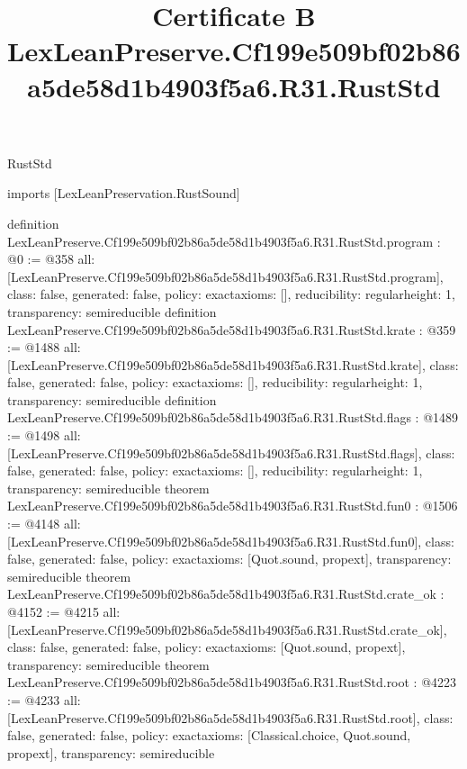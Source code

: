 \begin{lexlean}{RustStd}
\title{Certificate B LexLeanPreserve.Cf199e509bf02b86a5de58d1b4903f5a6.R31.RustStd}
\begin{coremodule}
imports [LexLeanPreservation.RustSound]

definition LexLeanPreserve.Cf199e509bf02b86a5de58d1b4903f5a6.R31.RustStd.program : @0 := @358 {
  all: [LexLeanPreserve.Cf199e509bf02b86a5de58d1b4903f5a6.R31.RustStd.program],
  class: false,
  generated: false,
  policy: exact{axioms: []},
  reducibility: regular{height: 1},
  transparency: semireducible
}
definition LexLeanPreserve.Cf199e509bf02b86a5de58d1b4903f5a6.R31.RustStd.krate : @359 := @1488 {
  all: [LexLeanPreserve.Cf199e509bf02b86a5de58d1b4903f5a6.R31.RustStd.krate],
  class: false,
  generated: false,
  policy: exact{axioms: []},
  reducibility: regular{height: 1},
  transparency: semireducible
}
definition LexLeanPreserve.Cf199e509bf02b86a5de58d1b4903f5a6.R31.RustStd.flags : @1489 := @1498 {
  all: [LexLeanPreserve.Cf199e509bf02b86a5de58d1b4903f5a6.R31.RustStd.flags],
  class: false,
  generated: false,
  policy: exact{axioms: []},
  reducibility: regular{height: 1},
  transparency: semireducible
}
theorem LexLeanPreserve.Cf199e509bf02b86a5de58d1b4903f5a6.R31.RustStd.fun0 : @1506 := @4148 {
  all: [LexLeanPreserve.Cf199e509bf02b86a5de58d1b4903f5a6.R31.RustStd.fun0],
  class: false,
  generated: false,
  policy: exact{axioms: [Quot.sound, propext]},
  transparency: semireducible
}
theorem LexLeanPreserve.Cf199e509bf02b86a5de58d1b4903f5a6.R31.RustStd.crate_ok : @4152 := @4215 {
  all: [LexLeanPreserve.Cf199e509bf02b86a5de58d1b4903f5a6.R31.RustStd.crate_ok],
  class: false,
  generated: false,
  policy: exact{axioms: [Quot.sound, propext]},
  transparency: semireducible
}
theorem LexLeanPreserve.Cf199e509bf02b86a5de58d1b4903f5a6.R31.RustStd.root : @4223 := @4233 {
  all: [LexLeanPreserve.Cf199e509bf02b86a5de58d1b4903f5a6.R31.RustStd.root],
  class: false,
  generated: false,
  policy: exact{axioms: [Classical.choice, Quot.sound, propext]},
  transparency: semireducible
}


\end{coremodule}
\end{lexlean}
